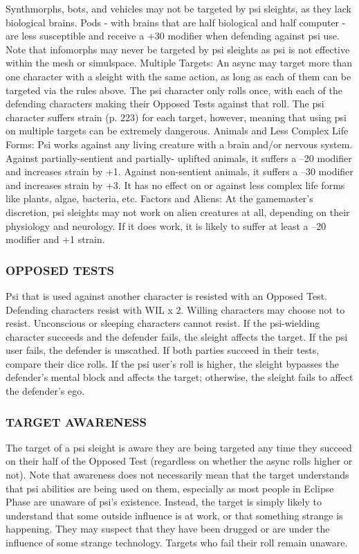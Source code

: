 Synthmorphs, bots, and vehicles may not be targeted
by psi sleights, as they lack biological brains. Pods
- with brains that are half biological and half computer -
are less susceptible and receive a +30 modifier
when defending against psi use. Note that infomorphs
may never be targeted by psi sleights as psi is not effective
within the mesh or simulspace.
Multiple Targets: An async may target more than
one character with a sleight with the same action, as
long as each of them can be targeted via the rules
above. The psi character only rolls once, with each of
the defending characters making their Opposed Tests
against that roll. The psi character suffers strain (p.
223) for each target, however, meaning that using psi
on multiple targets can be extremely dangerous.
Animals and Less Complex Life Forms: Psi works
against any living creature with a brain and/or
nervous system. Against partially-sentient and partially-
uplifted animals, it suffers a –20 modifier and
increases strain by +1. Against non-sentient animals,
it suffers a –30 modifier and increases strain by +3. It
has no effect on or against less complex life forms like
plants, algae, bacteria, etc.
Factors and Aliens: At the gamemaster’s discretion,
psi sleights may not work on alien creatures at all, depending
on their physiology and neurology. If it does
work, it is likely to suffer at least a –20 modifier and
+1 strain.

\subsubsection{OPPOSED TESTS}

Psi that is used against another character is resisted
with an Opposed Test. Defending characters resist with
WIL x 2. Willing characters may choose not to resist.
Unconscious or sleeping characters cannot resist.
If the psi-wielding character succeeds and the defender
fails, the sleight affects the target. If the psi user
fails, the defender is unscathed. If both parties succeed
in their tests, compare their dice rolls. If the psi
user’s roll is higher, the sleight bypasses the defender’s
mental block and affects the target; otherwise, the
sleight fails to affect the defender’s ego.

\subsubsection{TARGET AWARENESS}

The target of a psi sleight is aware they are being
targeted any time they succeed on their half of the
Opposed Test (regardless on whether the async
rolls higher or not). Note that awareness does not
necessarily mean that the target understands that psi
abilities are being used on them, especially as most
people in Eclipse Phase are unaware of psi’s existence.
Instead, the target is simply likely to understand that
some outside influence is at work, or that something
strange is happening. They may suspect that they
have been drugged or are under the influence of some
strange technology.
Targets who fail their roll remain unaware.

